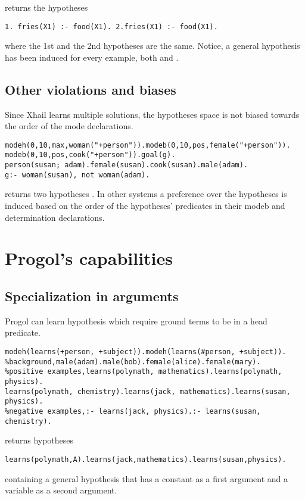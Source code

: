 returns the hypotheses

\begin{lstlisting}
1. fries(X1) :- food(X1). 2.fries(X1) :- food(X1).
\end{lstlisting}
where the 1st and the 2nd hypotheses are the same. Notice, a general hypothesis has been induced for every example, both  and .

\subsection{Other violations and biases}
Since Xhail learns multiple solutions, the hypotheses space is not biased towards the order of the mode declarations.
\begin{lstlisting}
modeh(0,10,max,woman("+person")).modeb(0,10,pos,female("+person")).
modeb(0,10,pos,cook("+person")).goal(g).
person(susan; adam).female(susan).cook(susan).male(adam).
g:- woman(susan), not woman(adam).
\end{lstlisting}
returns two hypotheses
. In other systems a preference over the hypotheses is induced based on the order of the hypotheses' predicates  in their modeb and determination declarations.

\section{Progol's capabilities}

\subsection{Specialization in arguments}
Progol can learn hypothesis which require ground terms to be in a head predicate.
\begin{lstlisting}
modeh(learns(+person, +subject)).modeh(learns(#person, +subject)).
%background,male(adam).male(bob).female(alice).female(mary).
%positive examples,learns(polymath, mathematics).learns(polymath, physics).
learns(polymath, chemistry).learns(jack, mathematics).learns(susan, physics).
%negative examples,:- learns(jack, physics).:- learns(susan, chemistry).
\end{lstlisting}
returns hypotheses
\begin{lstlisting}
learns(polymath,A).learns(jack,mathematics).learns(susan,physics).
\end{lstlisting}
containing a general hypothesis  that has a constant  as a first argument and a variable as a second argument.

